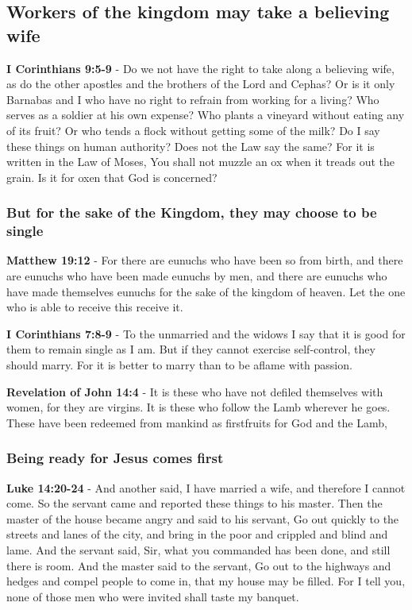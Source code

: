 \documentclass[11pt]{article}
\begin{document}
\subsection{Workers of the kingdom may take a believing wife}
\label{sec:orgaad0a8d}
\textbf{I Corinthians 9:5-9} - Do we not have the right to take along a believing wife, as do the other apostles and the brothers of the Lord and Cephas? Or is it only Barnabas and I who have no right to refrain from working for a living? Who serves as a soldier at his own expense? Who plants a vineyard without eating any of its fruit? Or who tends a flock without getting some of the milk? Do I say these things on human authority? Does not the Law say the same? For it is written in the Law of Moses, You shall not muzzle an ox when it treads out the grain. Is it for oxen that God is concerned?

\subsubsection{But for the sake of the Kingdom, they may choose to be single}
\label{sec:org9adcd18}

\textbf{Matthew 19:12} - For there are eunuchs who have been so from birth, and there are eunuchs who have been made eunuchs by men, and there are eunuchs who have made themselves eunuchs for the sake of the kingdom of heaven. Let the one who is able to receive this receive it.

\textbf{I Corinthians 7:8-9} - To the unmarried and the widows I say that it is good for them to remain single as I am. But if they cannot exercise self-control, they should marry. For it is better to marry than to be aflame with passion.

\textbf{Revelation of John 14:4} - It is these who have not defiled themselves with women, for they are virgins. It is these who follow the Lamb wherever he goes. These have been redeemed from mankind as firstfruits for God and the Lamb,

\subsubsection{Being ready for Jesus comes first}
\label{sec:orgf27a556}
\textbf{Luke 14:20-24} - And another said, I have married a wife, and therefore I cannot come. So the servant came and reported these things to his master. Then the master of the house became angry and said to his servant, Go out quickly to the streets and lanes of the city, and bring in the poor and crippled and blind and lame. And the servant said, Sir, what you commanded has been done, and still there is room. And the master said to the servant, Go out to the highways and hedges and compel people to come in, that my house may be filled. For I tell you, none of those men who were invited shall taste my banquet.
\end{document}
